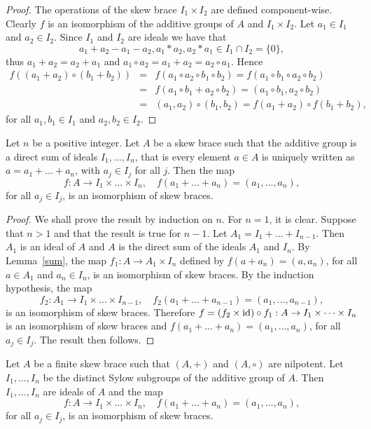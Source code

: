 \begin{proof}
The operations of the skew  brace $I_1\times I_2$
are defined component-wise. Clearly $f$ is an isomorphism of the
additive groups of $A$ and $I_1\times I_2$. Let $a_1\in I_1$ and
$a_2\in I_2$. Since $I_1$ and $I_2$ are ideals we have that
$$a_1+a_2-a_1-a_2, a_1*a_2, a_2*a_1\in I_1\cap I_2=\{ 0\},$$
thus $a_1+a_2=a_2+a_1$ and $a_1\circ a_2=a_1+a_2=a_2\circ a_1$.
Hence
\begin{eqnarray*} f((a_1+a_2)\circ (b_1+b_2))&=&f(a_1\circ
a_2\circ b_1\circ b_2)=
f(a_1\circ b_1\circ a_2\circ b_2)\\
&=&f(a_1\circ b_1 + a_2\circ b_2)=(a_1\circ b_1 , a_2\circ b_2)\\
&=&(a_1,a_2)\circ (b_1,b_2)=f(a_1+a_2)\circ f(b_1 +b_2),
\end{eqnarray*}
for all $a_1,b_1\in I_1$ and $a_2,b_2\in I_2$. 
\end{proof}

\begin{theorem}
    \label{thm:direct}
    Let $n$ be a positive integer. Let $A$ be a skew  brace such that the additive
group is a direct sum of ideals $I_1,\dots ,I_n$, that is every
element $a\in A$ is uniquely written as $a=a_1+\dots +a_n$, with
$a_j\in I_j$ for all $j$. Then the map \[
f:A\rightarrow
I_1\times\dots\times I_n,
\quad
f(a_1+\dots +a_n)=(a_1,\dots
,a_n),
\]
for all $a_j\in I_j$, is an isomorphism of skew braces.
\end{theorem}

\begin{proof}
We shall prove the result by induction on $n$. For $n=1$, it is
clear. Suppose that $n>1$ and that the result is true for $n-1$. Let
$A_1=I_1+\dots +I_{n-1}$. Then $A_1$ is an ideal of $A$ and $A$ is
the direct sum of the ideals $A_1$ and $I_n$. By Lemma~\ref{sum},
the map $f_1: A\rightarrow A_1\times I_n$ defined by
$f(a+a_n)=(a,a_n)$, for all $a\in A_1$ and $a_n\in I_n$, is an
isomorphism of skew braces. By the induction hypothesis, the
map
\[
    f_2:A_1\rightarrow I_1\times \dots\times I_{n-1},
    \quad
    f_2(a_1+\dots +a_{n-1})=(a_1,\dots ,a_{n-1}),
\]
is an isomorphism of skew braces. Therefore $f=(f_2\times
\operatorname{id})\circ f_1:A\rightarrow I_1\times\dots\times I_n$ is an
isomorphism of skew braces and $f(a_1+\dots +a_n)=(a_1,\dots
,a_n)$, for all $a_j\in I_j$. The result then follows.
\end{proof}

\begin{corollary}
    \label{cor:product}
    Let $A$ be a finite skew brace such that $(A,+)$ and $(A,\circ)$ are nilpotent.
Let $I_1,\dots ,I_n$ be the distinct Sylow subgroups of the additive
group of $A$. Then $I_1,\dots ,I_n$ are ideals of $A$ and the map
\[
f:A\rightarrow I_1\times\dots\times I_n,
\quad
f(a_1+\dots+a_n)=(a_1,\dots ,a_n),
\]
for all $a_j\in I_j$, is an isomorphism of
skew braces.
\end{corollary}

